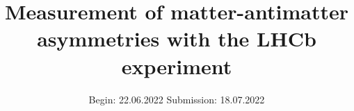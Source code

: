 


\title{Measurement of matter-antimatter asymmetries with the LHCb experiment}
\date{%
  Begin: 22.06.2022
  \hspace{3em}
  Submission:  18.07.2022
}



\maketitle
\thispagestyle{empty}
\tableofcontents
\newpage






\printbibliography{}


